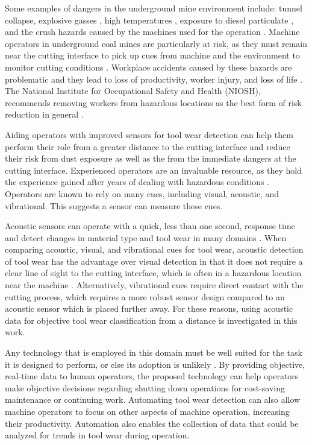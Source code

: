 Some examples of dangers in the underground mine environment include: 
tunnel collapse, explosive gasses \cite{Juganda2022},
high temperatures \cite{cinar2020}, exposure to diesel particulate \cite{Bugarski2022},
and the crush hazards caused by the machines used for the operation \cite{Swanson2019}.
Machine operators in underground coal mines are particularly at risk,
as they must remain near the cutting interface to pick up cues from machine and the environment
to monitor cutting conditions \cite{Bartels2009}.
Workplace accidents caused by these hazards are problematic and they lead to 
loss of productivity, worker injury, and loss of life \cite{sensogut2021}.
The National Institute for Occupational Safety and Health (NIOSH), 
recommends removing workers from hazardous locations as the best form
of risk reduction in general \cite{niosh_2015}.

Aiding operators with improved sensors for tool wear detection can help them 
perform their role from a greater distance to the cutting interface and 
reduce their risk from dust exposure as well as the from the immediate dangers at the cutting interface.
Experienced operators are an invaluable resource, 
 as they hold the experience gained after years of dealing with hazardous conditions \cite{Bartels2009}.
Operators are known to rely on many cues, including visual, acoustic, and vibrational.
This suggests a sensor can measure these cues.

Acoustic sensors can operate with a quick, less than one second, response time and detect changes in 
material type and tool wear in many domains \cite{Zakeri2017, Zhong2013, Rad2014, Zakeri2015}.
When comparing acoustic, visual, and vibrational cues for tool wear,
acoustic detection of tool wear has the advantage over visual detection in that it
does not require a clear line of sight to the cutting interface, 
which is often in a hazardous location near the machine \cite{Bartels2009}.
Alternatively, vibrational cues require direct contact with the cutting process, 
which requires a more robust sensor design compared to an acoustic sensor which is placed further away.
For these reasons, using acoustic data for objective tool wear classification from a distance is investigated in this work.

Any technology that is employed in this domain must be well suited for the task it is
designed to perform, or else its adoption is unlikely \cite{Swanson2019}.
By providing objective, real-time data to human operators, the proposed technology can help operators 
make objective decisions regarding shutting down operations for cost-saving maintenance or continuing work. 
Automating tool wear detection can also allow machine operators to focus on other aspects of machine operation, 
increasing their productivity. Automation also enables the collection of data that could be analyzed 
for trends in tool wear during operation.

